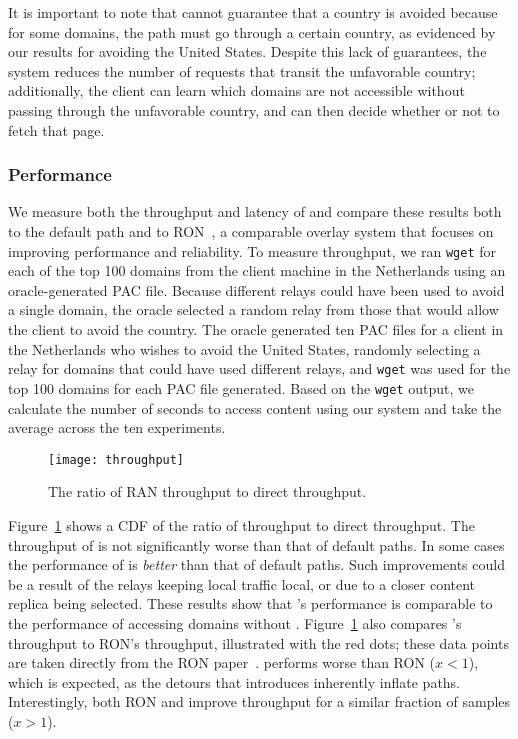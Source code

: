 It is important to note that \system{} cannot guarantee that a country is 
avoided because for some domains, the path must go through a certain 
country, as evidenced by our results for avoiding the United States.  Despite 
this lack of guarantees, the system reduces the number of requests that 
transit the unfavorable country; additionally, the client can learn which domains 
are not accessible without passing through the unfavorable country, and can then 
decide whether or not to fetch that page.  

\subsubsection{Performance}
We measure both 
the throughput and latency of \system{} and compare these results both to the default
path and to RON~\cite{andersen2001resilient}, a comparable overlay system that focuses
on improving performance and reliability.
To measure throughput, we ran {\tt wget} for each 
of the top 100 domains from the client machine in the Netherlands 
using an oracle-generated PAC file.  Because different relays could have been 
used to avoid a single domain, the oracle selected a random relay from those 
that would allow the client to avoid the country.  The oracle generated 
ten PAC files for a client in the Netherlands who wishes to avoid the United States,
 randomly selecting a relay for domains that could have used 
different relays, and {\tt wget} was used for the top 100 domains for each 
PAC file generated.  Based on the {\tt wget} output, we calculate the number 
of seconds to access content using our system and take the average across the 
ten experiments. 

\begin{figure}[t]
\centering
\texttt{[image: throughput]}
\caption{The ratio of RAN throughput to direct throughput. } 
\label{fig:throughput}
\end{figure}

Figure~\ref{fig:throughput} shows a CDF of the ratio of \system{}
throughput to direct throughput.  The throughput of
\system{} is not significantly worse than that of default paths.  
In some cases the performance of \system{} is {\it better} than
that of default paths.  Such improvements could be a result of the
relays keeping local traffic local, or due to a closer content replica
being selected.  These results show that \system{}'s performance is
comparable to the performance of accessing domains without \system{}.
Figure~\ref{fig:throughput} also compares \system{}'s throughput to
RON's throughput, illustrated with the red dots; these data points are taken 
directly from the RON paper~\cite{andersen2001resilient}.  \system{} performs
worse than RON ($x < 1$), which is expected, as the detours that
\system{} introduces inherently inflate paths.  Interestingly, both
RON and \system{} improve throughput for a similar fraction of samples
($x>1$).

